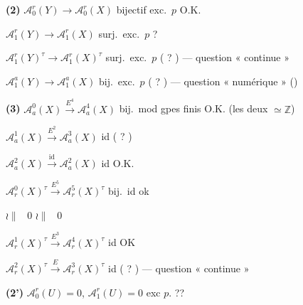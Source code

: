\documentclass[11pt,a4paper]{article}
\begin{document}
\textbf{(2)} \quad $\mathcal{A}^{r}_{0}(Y) \to \mathcal{A}^{r}_{0}(X)$ \quad
bijectif exc.\ $p$ \qquad O.K.


\qquad $\mathcal{A}^{r}_{1}(Y) \longrightarrow \mathcal{A}^{r}_{1}(X)$ \quad
surj.\ exc.\ $p$ \quad ?

\qquad $\mathcal{A}^{r}_{1}(Y)^{\tau} \longrightarrow
\mathcal{A}^{r}_{1}(X)^{\tau}$ \quad surj.\ exc.\ $p$ \quad ( ? ) --- question
« continue »

\qquad $\mathcal{A}^{a}_{1}(Y) \longrightarrow \mathcal{A}^{a}_{1}(X)$ \quad
bij.\ exc.\ $p$ \quad ( ? ) --- question « numérique » ()

\textbf{(3)} \quad $\mathcal{A}^{0}_{a}(X) \xrightarrow{E^{4}}
\mathcal{A}^{4}_{a}(X)$ \quad bij.\ mod gpes finis \qquad O.K.
\qquad (les deux $\simeq \mathbb{Z}$)

\qquad $\mathcal{A}^{1}_{a}(X) \xrightarrow{E^{2}} \mathcal{A}^{3}_{a}(X)$
\quad id \quad ( ? )

\qquad $\mathcal{A}^{2}_{a}(X) \xrightarrow{\ \mathrm{id}\ }
\mathcal{A}^{2}_{a}(X)$ \quad id \qquad O.K.


\qquad $\mathcal{A}^{0}_{r}(X)^{\tau} \xrightarrow{E^{5}}
\mathcal{A}^{5}_{r}(X)^{\tau}$ \quad bij.\ id \qquad ok

\qquad\qquad $\wr\!\!\parallel$ \ $0$ \qquad $\wr\!\!\parallel$ \ $0$

\qquad $\mathcal{A}^{1}_{r}(X)^{\tau} \xrightarrow{E^{3}}
\mathcal{A}^{4}_{r}(X)^{\tau}$ \quad id \qquad OK


\qquad $\mathcal{A}^{2}_{r}(X)^{\tau} \xrightarrow{\ E\ }
\mathcal{A}^{3}_{r}(X)^{\tau}$ \quad id \quad ( ? ) --- question « continue »

\textbf{(2')} \quad $\mathcal{A}^{r}_{0}(U) = 0$, \quad
$\mathcal{A}^{r}_{1}(U) = 0$ \quad exc $p$. \qquad ??
\end{document}

